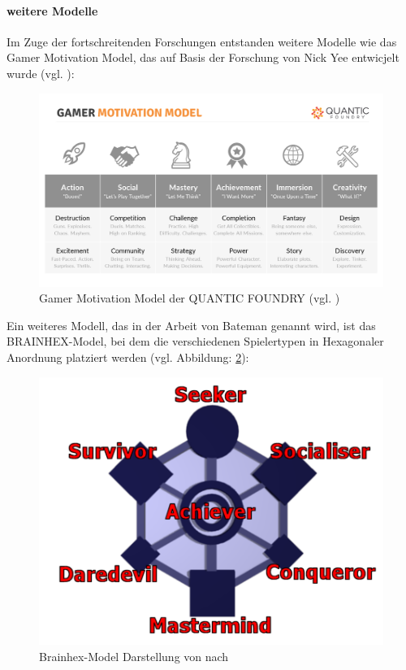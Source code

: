 \paragraph{weitere Modelle}
Im Zuge der fortschreitenden Forschungen entstanden weitere Modelle wie das Gamer Motivation Model, das auf Basis der Forschung von Nick Yee entwicjelt wurde (vgl. \cite{ludologie_spielertypen_nodate}):

\begin{figure}[ht]
\centering
\includegraphics[width=1\linewidth]{content/pictures/gamer_motivations_model.png}
\caption{Gamer Motivation Model der QUANTIC FOUNDRY (vgl. \cite{noauthor_quantic_nodate})}
\label{fig:gamer_motivation_model}
\end{figure}

Ein weiteres Modell, das in der Arbeit von Bateman genannt wird, ist das BRAINHEX-Model, bei dem die verschiedenen Spielertypen in Hexagonaler Anordnung platziert werden (vgl. Abbildung: \ref{fig:brain-hex}):

\begin{figure}[ht]
\centering
\includegraphics[width=1\linewidth]{content/pictures/brainhex-classes.png}
\caption{Brainhex-Model Darstellung von \cite{noauthor_i_nodate} nach \cite{nacke_brainhex_2013}}
\label{fig:brain-hex}
\end{figure}

